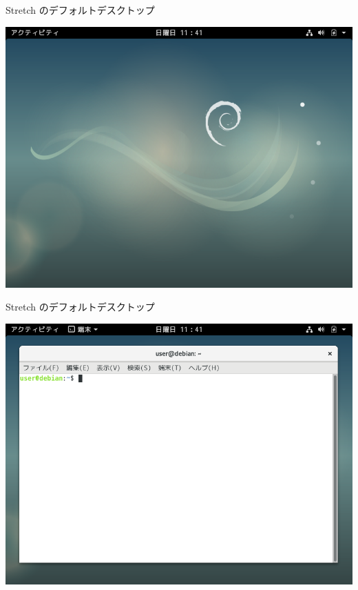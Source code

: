 \begin{frame}{Stretch のデフォルトデスクトップ}

\begin{center}
\includegraphics[keepaspectratio,width=1\hsize]{image201907/stretch_gnome_1.png}
\end{center}

\end{frame}

\begin{frame}{Stretch のデフォルトデスクトップ}

\begin{center}
\includegraphics[keepaspectratio,width=1\hsize]{image201907/stretch_gnome_2.png}
\end{center}

\end{frame}


